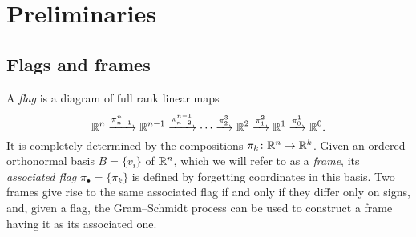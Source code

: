 
\section{Preliminaries}

\subsection{Flags and frames}

A \emph{flag} is a diagram of full rank linear maps
\[
\mathbb{R}^n \xrightarrow{\pi^n_{n-1}} \mathbb{R}^{n-1} \xrightarrow{\pi^{n-1}_{n-2}} \dotsb \xrightarrow{\pi^3_{2}} \mathbb{R}^2 \xrightarrow{\pi^2_1} \mathbb{R}^1 \xrightarrow{\pi^1_0} \mathbb{R}^0.
\]
It is completely determined by the compositions
$\pi_k \colon \mathbb{R}^n \to \mathbb{R}^k$.
Given an ordered orthonormal basis $B = \{v_i\}$ of $\mathbb{R}^n$, which we will refer to as a \textit{frame}, its \emph{associated flag} $\pi_\bullet = \{\pi_k\}$ is defined by forgetting coordinates in this basis.
Two frames give rise to the same associated flag if and only if they differ only on signs, and, given a flag, the Gram--Schmidt process can be used to construct a frame having it as its associated one.

%
